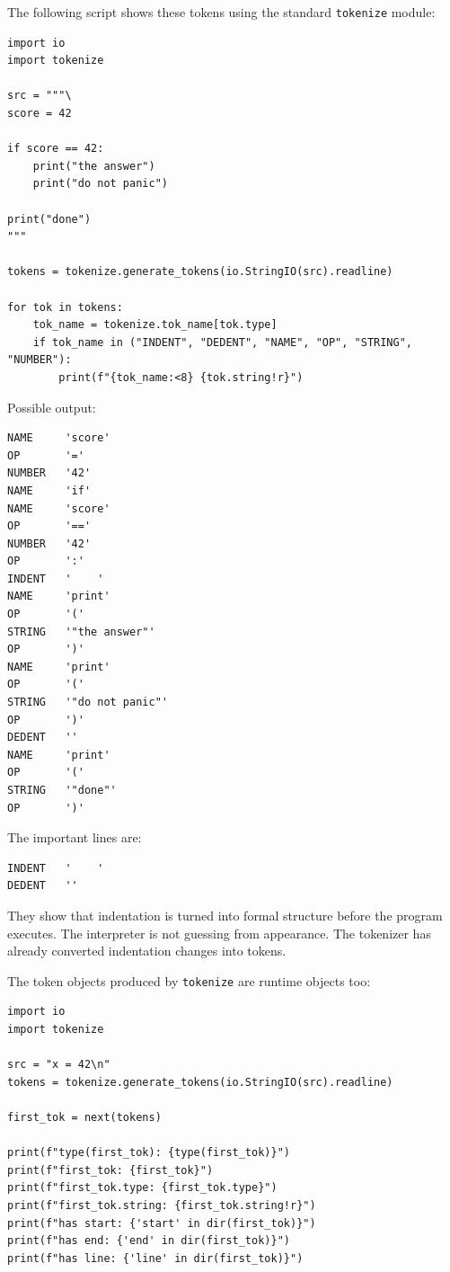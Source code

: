 \documentclass[a4paper,twoside]{report}
\begin{document}
The following script shows these tokens using the standard \texttt{tokenize} module:

\begin{verbatim}
import io
import tokenize

src = """\
score = 42

if score == 42:
    print("the answer")
    print("do not panic")

print("done")
"""

tokens = tokenize.generate_tokens(io.StringIO(src).readline)

for tok in tokens:
    tok_name = tokenize.tok_name[tok.type]
    if tok_name in ("INDENT", "DEDENT", "NAME", "OP", "STRING", "NUMBER"):
        print(f"{tok_name:<8} {tok.string!r}")
\end{verbatim}

Possible output:

\begin{verbatim}
NAME     'score'
OP       '='
NUMBER   '42'
NAME     'if'
NAME     'score'
OP       '=='
NUMBER   '42'
OP       ':'
INDENT   '    '
NAME     'print'
OP       '('
STRING   '"the answer"'
OP       ')'
NAME     'print'
OP       '('
STRING   '"do not panic"'
OP       ')'
DEDENT   ''
NAME     'print'
OP       '('
STRING   '"done"'
OP       ')'
\end{verbatim}

The important lines are:

\begin{verbatim}
INDENT   '    '
DEDENT   ''
\end{verbatim}

They show that indentation is turned into formal structure before the program executes. The interpreter is not guessing from appearance. The tokenizer has already converted indentation changes into tokens.

The token objects produced by \texttt{tokenize} are runtime objects too:

\begin{verbatim}
import io
import tokenize

src = "x = 42\n"
tokens = tokenize.generate_tokens(io.StringIO(src).readline)

first_tok = next(tokens)

print(f"type(first_tok): {type(first_tok)}")
print(f"first_tok: {first_tok}")
print(f"first_tok.type: {first_tok.type}")
print(f"first_tok.string: {first_tok.string!r}")
print(f"has start: {'start' in dir(first_tok)}")
print(f"has end: {'end' in dir(first_tok)}")
print(f"has line: {'line' in dir(first_tok)}")
\end{verbatim}
\end{document}
